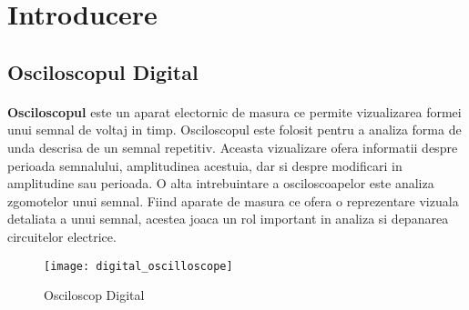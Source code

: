 \section{Introducere}






\subsection{Osciloscopul Digital}

\paragraph{}
{\bf Osciloscopul} este un aparat electornic de masura ce permite vizualizarea formei unui semnal de voltaj in timp. Osciloscopul este folosit pentru a analiza forma de unda descrisa de un semnal repetitiv. Aceasta vizualizare ofera informatii despre perioada semnalului, amplitudinea acestuia, dar si despre modificari in amplitudine sau perioada. O alta intrebuintare a osciloscoapelor este analiza zgomotelor unui semnal. Fiind aparate de masura ce ofera o reprezentare vizuala detaliata a unui semnal, acestea joaca un rol important in analiza si depanarea circuitelor electrice.

\begin{figure}[h]
\centering
\texttt{[image: digital\_oscilloscope]}
\caption{Osciloscop Digital}
\label{fig:digital_oscilloscope}
\end{figure}

